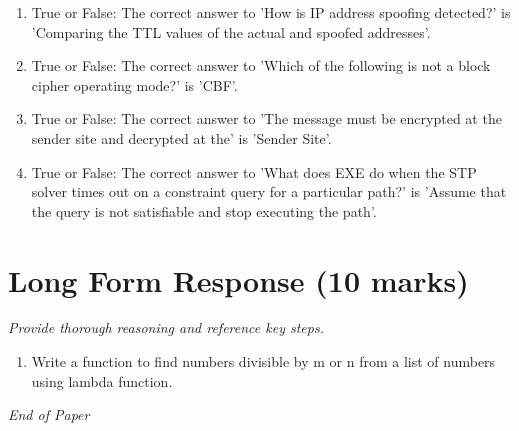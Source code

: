 \documentclass[12pt]{article}
\begin{document}
\begin{enumerate}[label=\arabic*.]
\item True or False: The correct answer to 'How is IP address spoofing detected?' is 'Comparing the TTL values of the actual and spoofed addresses'.
\item True or False: The correct answer to 'Which of the following is not a block cipher operating mode?' is 'CBF'.
\item True or False: The correct answer to 'The message must be encrypted at the sender site and decrypted at the' is 'Sender Site'.
\item True or False: The correct answer to 'What does EXE do when the STP solver times out on a constraint query for a particular path?' is 'Assume that the query is not satisfiable and stop executing the path'.
\end{enumerate}

\section*{Long Form Response (10 marks)}
\textit{Provide thorough reasoning and reference key steps.}
\begin{enumerate}[label=\arabic*.]
\item Write a function to find numbers divisible by m or n from a list of numbers using lambda
function.
\end{enumerate}

\vfill
\noindent\textit{End of Paper}
\end{document}

